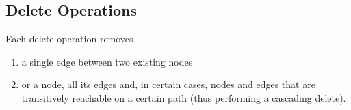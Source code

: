 

\subsection{Delete Operations}
\label{sec:delete-operations}

Each delete operation removes

\begin{enumerate}
    \item a single edge between two existing nodes
    \item or a node, all its edges and, in certain cases, nodes and edges that are transitively reachable on a certain path (thus performing a cascading delete).
\end{enumerate}


